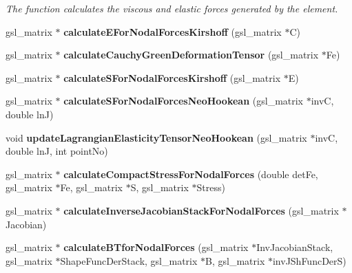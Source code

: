 \begin{DoxyCompactItemize}
\begin{DoxyCompactList}\small\item\em The function calculates the viscous and elastic forces generated by the element. \end{DoxyCompactList}\item 
\hypertarget{classShapeBase_a347fb2687678294a252a12820842cb0d}{}gsl\+\_\+matrix $\ast$ {\bfseries calculate\+E\+For\+Nodal\+Forces\+Kirshoff} (gsl\+\_\+matrix $\ast$C)\label{classShapeBase_a347fb2687678294a252a12820842cb0d}

\item 
\hypertarget{classShapeBase_ae09cb91359e10677889c3f59c3f5d70a}{}gsl\+\_\+matrix $\ast$ {\bfseries calculate\+Cauchy\+Green\+Deformation\+Tensor} (gsl\+\_\+matrix $\ast$Fe)\label{classShapeBase_ae09cb91359e10677889c3f59c3f5d70a}

\item 
\hypertarget{classShapeBase_a9c79b3bced80eac8af18a0a81d3898ab}{}gsl\+\_\+matrix $\ast$ {\bfseries calculate\+S\+For\+Nodal\+Forces\+Kirshoff} (gsl\+\_\+matrix $\ast$E)\label{classShapeBase_a9c79b3bced80eac8af18a0a81d3898ab}

\item 
\hypertarget{classShapeBase_a697f24754441df216b4245e7eb467b13}{}gsl\+\_\+matrix $\ast$ {\bfseries calculate\+S\+For\+Nodal\+Forces\+Neo\+Hookean} (gsl\+\_\+matrix $\ast$inv\+C, double ln\+J)\label{classShapeBase_a697f24754441df216b4245e7eb467b13}

\item 
\hypertarget{classShapeBase_a606ddc7f909062e9faae9f4a311ccd8a}{}void {\bfseries update\+Lagrangian\+Elasticity\+Tensor\+Neo\+Hookean} (gsl\+\_\+matrix $\ast$inv\+C, double ln\+J, int point\+No)\label{classShapeBase_a606ddc7f909062e9faae9f4a311ccd8a}

\item 
\hypertarget{classShapeBase_a56e588bb8d290158200c6e35826f7566}{}gsl\+\_\+matrix $\ast$ {\bfseries calculate\+Compact\+Stress\+For\+Nodal\+Forces} (double det\+Fe, gsl\+\_\+matrix $\ast$Fe, gsl\+\_\+matrix $\ast$S, gsl\+\_\+matrix $\ast$Stress)\label{classShapeBase_a56e588bb8d290158200c6e35826f7566}

\item 
\hypertarget{classShapeBase_ac9eaa594e8955de91b2f4b0368c85bae}{}gsl\+\_\+matrix $\ast$ {\bfseries calculate\+Inverse\+Jacobian\+Stack\+For\+Nodal\+Forces} (gsl\+\_\+matrix $\ast$Jacobian)\label{classShapeBase_ac9eaa594e8955de91b2f4b0368c85bae}

\item 
\hypertarget{classShapeBase_ad67919694a1d780e31f6d539781377be}{}gsl\+\_\+matrix $\ast$ {\bfseries calculate\+B\+Tfor\+Nodal\+Forces} (gsl\+\_\+matrix $\ast$Inv\+Jacobian\+Stack, gsl\+\_\+matrix $\ast$Shape\+Func\+Der\+Stack, gsl\+\_\+matrix $\ast$B, gsl\+\_\+matrix $\ast$inv\+J\+Sh\+Func\+Der\+S)\label{classShapeBase_ad67919694a1d780e31f6d539781377be}


\end{DoxyCompactItemize}
